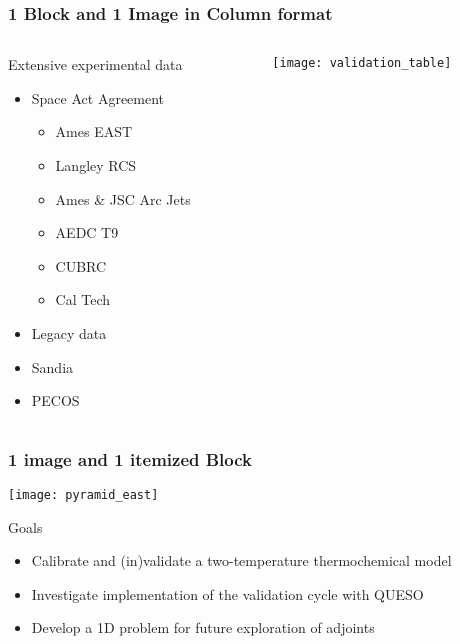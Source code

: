 \documentclass[mathserif]{beamer}
\begin{document}
\begin{frame}                                                                                                                                                                          
\frametitle{1 Block and 1 Image in Column format}
\begin{columns}[c]
\begin{column}{5cm}
\begin{block}{Extensive experimental data}
\begin{itemize}
\item {\color{pecos6}Space Act Agreement}
\begin{itemize}
\item Ames EAST
\item Langley RCS
\item Ames \& JSC Arc Jets
\item AEDC T9
\item CUBRC
\item Cal Tech
\end{itemize}
\item Legacy data
\item Sandia
\item PECOS
\end{itemize}
\end{block}
\end{column}
\begin{column}{5cm}
\texttt{[image: validation\_table]}
\end{column}
\end{columns}
\end{frame}

\begin{frame}                                                                                                                                                                          
\frametitle{1 image and 1 itemized Block}
\begin{center}
\texttt{[image: pyramid\_east]}\\
\end{center}
\begin{block}{Goals}
\begin{itemize}
\item Calibrate and (in)validate a two-temperature thermochemical model  
\item Investigate implementation of the validation cycle with QUESO  %
\item Develop a 1D problem for future exploration of adjoints
\end{itemize}
\end{block}
\end{frame}
\end{document}
